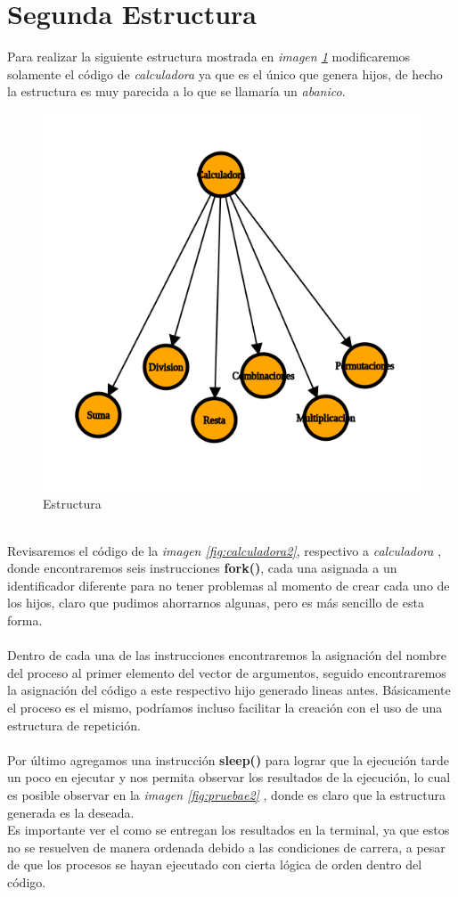 \documentclass[10pt]{article}
\begin{document}
	\section{Segunda Estructura}
	Para realizar la siguiente estructura mostrada en \emph{imagen  \ref{fig:est2}} modificaremos solamente  el código de \emph{calculadora} ya que es el único que genera hijos, de hecho la estructura es muy parecida a lo que se llamaría un \textit{abanico}. 
	\begin{figure}[h!]
		\centering
		\includegraphics[width=0.5\linewidth]{graph2.png}
		\caption{Estructura}
		\label{fig:est2}
	\end{figure}
	\\
	Revisaremos el código de la \emph{imagen \ref{fig:calculadora2}}, respectivo a \textit{calculadora} , donde encontraremos seis instrucciones \textbf{fork()}, cada una asignada a un identificador diferente para no tener problemas al momento de crear cada uno de los hijos, claro que pudimos ahorrarnos algunas, pero es más sencillo de esta forma. 
	\\\\
	Dentro de cada una de las instrucciones encontraremos la asignación del nombre del proceso al primer elemento  del vector de argumentos, seguido encontraremos la asignación del código a este respectivo hijo generado lineas antes. Básicamente el proceso es el mismo, podríamos incluso facilitar la creación con el uso de una estructura de repetición. 
	\\\\
	Por último agregamos una instrucción \textbf{sleep()} para lograr que la ejecución tarde un poco en ejecutar y nos permita observar los resultados de la ejecución, lo cual es posible observar en la \emph{imagen \ref{fig:pruebae2}} , donde es claro que la estructura generada es la deseada. 
	\\
	Es importante ver el como se entregan los resultados en la terminal, ya que estos no se resuelven de manera ordenada debido a las condiciones de carrera, a pesar de que los procesos se hayan ejecutado con cierta lógica de orden dentro del código. 
\end{document}
